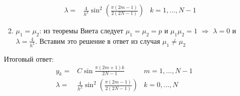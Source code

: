 \documentclass[12pt]{article}
\begin{document}
\begin{enumerate}
\begin{enumerate}
\begin{align*}
            \lambda=&\frac{4}{h^2}\sin^2\left(\frac{\pi(2m-1)}{2(2N-1)}\right) &k=1,...,N-1
        \end{align*}
        \item $\mu_1 = \mu_2$: из теоремы Виета следует 
        $\mu_1=\mu_2=p$ и $\mu_1\mu_2 = 1$ $\Rightarrow$ $\lambda=0$ и $\lambda=\frac{4}{h^2}$.
        Вставим это решение в ответ из случая $\mu_1\neq\mu_2$
    \end{enumerate}
    Итоговый ответ:
    \begin{align*}
        y_k=&C\sin\frac{\pi(2m+1)k}{2N-1}  &m=1,...,N-1\\
        \lambda=&\frac{4}{h^2}\sin^2\left(\frac{\pi(2m-1)}{2(2N-1)}\right) &k=0,...,N
    \end{align*}
\end{enumerate}
\end{document}
